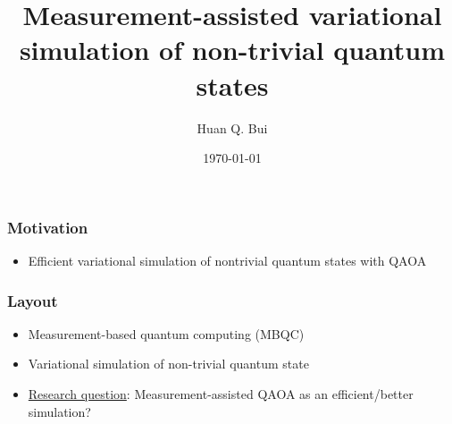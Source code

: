 \documentclass{beamer}
\title{Measurement-assisted variational simulation of non-trivial quantum states}
\author[Huan Q. Bui] %
{Huan Q. Bui}
\institute[Perimeter Institute] %
{
	
	Advisor: Timothy Hsieh
	\and
	Perimeter Institute for Theoretical Physics
}
\date{\today}
\theoremstyle{definition}
\begin{document}
 
\frame{\titlepage}




\begin{frame}


\frametitle{Motivation}


\begin{itemize}
	\item Efficient variational simulation of nontrivial quantum states with QAOA \cite{VQCS}
\end{itemize}


\end{frame}



\begin{frame}

\frametitle{Layout}

\begin{itemize}
	\item Measurement-based quantum computing (MBQC)
	\item Variational simulation of non-trivial quantum state
	\item \underline{Research question}: Measurement-assisted QAOA as an efficient/better simulation?
\end{itemize}

\end{frame}



\end{document}
